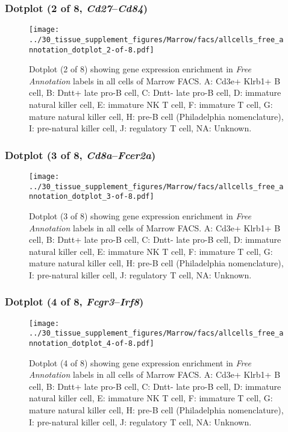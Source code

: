 \clearpage

\subsubsection{Dotplot (2 of 8, \emph{Cd27}--\emph{Cd84})}
\begin{figure}[h]
\centering
\texttt{[image: ../30\_tissue\_supplement\_figures/Marrow/facs/allcells\_free\_annotation\_dotplot\_2-of-8.pdf]}

\caption{ Dotplot (2 of 8)  showing gene expression enrichment in \emph{Free Annotation} labels in all cells of Marrow FACS. A: Cd3e+ Klrb1+ B cell, B: Dntt+ late pro-B cell, C: Dntt- late pro-B cell, D: immature natural killer cell, E: immature NK T cell, F: immature T cell, G: mature natural killer cell, H: pre-B cell (Philadelphia nomenclature), I: pre-natural killer cell, J: regulatory T cell, NA: Unknown.}
\end{figure}


\clearpage

\subsubsection{Dotplot (3 of 8, \emph{Cd8a}--\emph{Fcer2a})}
\begin{figure}[h]
\centering
\texttt{[image: ../30\_tissue\_supplement\_figures/Marrow/facs/allcells\_free\_annotation\_dotplot\_3-of-8.pdf]}

\caption{ Dotplot (3 of 8)  showing gene expression enrichment in \emph{Free Annotation} labels in all cells of Marrow FACS. A: Cd3e+ Klrb1+ B cell, B: Dntt+ late pro-B cell, C: Dntt- late pro-B cell, D: immature natural killer cell, E: immature NK T cell, F: immature T cell, G: mature natural killer cell, H: pre-B cell (Philadelphia nomenclature), I: pre-natural killer cell, J: regulatory T cell, NA: Unknown.}
\end{figure}


\clearpage

\subsubsection{Dotplot (4 of 8, \emph{Fcgr3}--\emph{Irf8})}
\begin{figure}[h]
\centering
\texttt{[image: ../30\_tissue\_supplement\_figures/Marrow/facs/allcells\_free\_annotation\_dotplot\_4-of-8.pdf]}

\caption{ Dotplot (4 of 8)  showing gene expression enrichment in \emph{Free Annotation} labels in all cells of Marrow FACS. A: Cd3e+ Klrb1+ B cell, B: Dntt+ late pro-B cell, C: Dntt- late pro-B cell, D: immature natural killer cell, E: immature NK T cell, F: immature T cell, G: mature natural killer cell, H: pre-B cell (Philadelphia nomenclature), I: pre-natural killer cell, J: regulatory T cell, NA: Unknown.}
\end{figure}


